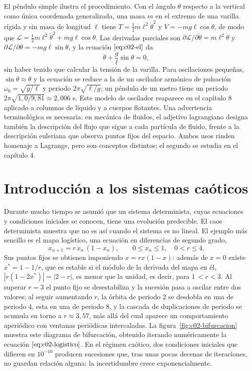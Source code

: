 \documentclass[10pt,openany]{book}
\begin{document}
El péndulo simple ilustra el procedimiento. Con el ángulo \(\theta\) respecto a la vertical como única coordenada generalizada, una masa \(m\) en el extremo de una varilla rígida y sin masa de longitud \(\ell\) tiene \(T = \tfrac12 m\ell^{2}\dot\theta^{2}\) y \(V = -mg\ell\cos\theta\), de modo que \(\mathcal{L} = \tfrac12 m\ell^{2}\dot\theta^{2} + mg\ell\cos\theta\). Las derivadas parciales son \(\partial\mathcal{L}/\partial\dot\theta = m\ell^{2}\dot\theta\) y \(\partial\mathcal{L}/\partial\theta = -mg\ell\sin\theta\), y la ecuación \(\eqref{eq:c02-el}\) da
\begin{equation}
\ddot\theta + \frac{g}{\ell}\sin\theta = 0, \label{eq:c02-pendulo}
\end{equation}
sin haber tenido que calcular la tensión de la varilla. Para oscilaciones pequeñas, \(\sin\theta \approx \theta\) y la ecuación se reduce a la de un oscilador armónico de pulsación \(\omega_0 = \sqrt{g/\ell}\) y periodo \(2\pi\sqrt{\ell/g}\); un péndulo de un metro tiene un periodo \(2\pi\sqrt{1{,}0/9{,}81} \approx 2{,}006\) s. Este modelo de oscilador reaparece en el capítulo 8 aplicado a columnas de líquido y a cuerpos flotantes. Una advertencia terminológica es necesaria: en mecánica de fluidos, el adjetivo lagrangiano designa también la descripción del flujo que sigue a cada partícula de fluido, frente a la descripción euleriana que observa puntos fijos del espacio. Ambos usos rinden homenaje a Lagrange, pero son conceptos distintos; el segundo se estudia en el capítulo 4.

\section{Introducción a los sistemas caóticos}

Durante mucho tiempo se asumió que un sistema determinista, cuyas ecuaciones y condiciones iniciales se conocen, tiene una evolución predecible. El caos determinista muestra que no es así cuando el sistema es no lineal. El ejemplo más sencillo es el mapa logístico, una ecuación en diferencias de segundo grado,
\begin{equation}
x_{n+1} = r\,x_n\,(1 - x_n), \qquad 0 \le x_n \le 1,\quad 0 < r \le 4. \label{eq:c02-logistico}
\end{equation}
Sus puntos fijos se obtienen imponiendo \(x = r x(1-x)\): además de \(x = 0\) existe \(x^{*} = 1 - 1/r\), que es estable si el módulo de la derivada del mapa en él, \(|r(1-2x^{*})| = |2 - r|\), es menor que la unidad, es decir, para \(1\,< r < 3\). Al superar \(r = 3\) el punto fijo se desestabiliza y la sucesión pasa a oscilar entre dos valores; al seguir aumentando \(r\), la órbita de periodo 2 se desdobla en una de periodo 4, esta en una de periodo 8, y la cascada de duplicaciones de periodo se acumula en torno a \(r \approx 3{,}57\), más allá del cual aparece un comportamiento aperiódico con ventanas periódicas intercaladas. La figura~\ref{fig:c02-bifurcacion} muestra este diagrama de bifurcación, obtenido iterando numéricamente la ecuación \(\eqref{eq:c02-logistico}\). En el régimen caótico, dos condiciones iniciales que difieren en \(10^{-10}\) producen sucesiones que, tras unas pocas decenas de iteraciones, no guardan relación alguna: la incertidumbre crece exponencialmente.
\end{document}
